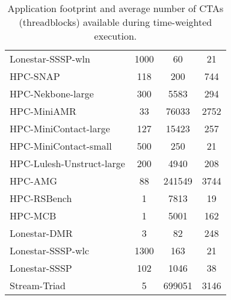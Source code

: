 \begin{table}[t]
\begin{small}
\begin{tabular}{lccc}
Lonestar-SSSP-wln & 1000 & 60 & 21 \\
HPC-SNAP & 118 & 200 & 744 \\
HPC-Nekbone-large & 300 & 5583 & 294 \\
HPC-MiniAMR & 33 & 76033 & 2752 \\
HPC-MiniContact-large & 127 & 15423 & 257 \\
HPC-MiniContact-small & 500 & 250 & 21 \\
HPC-Lulesh-Unstruct-large & 200 & 4940 & 208 \\
HPC-AMG & 88 & 241549 & 3744 \\
HPC-RSBench & 1 & 7813 & 19 \\
HPC-MCB & 1 & 5001 & 162 \\
Lonestar-DMR & 3 & 82 & 248 \\
Lonestar-SSSP-wlc & 1300 & 163 & 21 \\
Lonestar-SSSP & 102 & 1046 & 38 \\
Stream-Triad & 5 & 699051 & 3146 \\
\toprule
\end{tabular}
\caption{Application footprint and average number of CTAs (threadblocks) 
available during time-weighted execution.}
\label{tab:numctas}
\end{small}
\end{table}